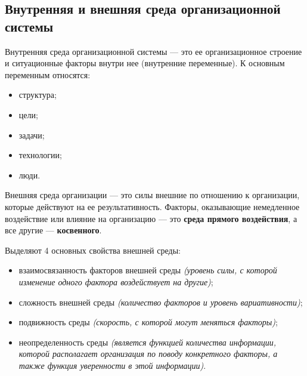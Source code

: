 \documentclass[a4paper,12pt,oneside,final]{extarticle}
\numberwithin{equation}{section}
\begin{document}
\subsection{Внутренняя и внешняя среда организационной системы}
Внутренняя среда организационной системы --- это ее организационное строение и ситуационные факторы внутри нее (внутренние переменные).
К основным переменным относятся: 
\begin{itemize}
	\item структура;
	\item цели;
	\item задачи;
	\item технологии; 
	\item люди.
\end{itemize}

Внешняя среда организации --- это силы внешние по отношению к организации, которые действуют на ее результативность. 
Факторы, оказывающие немедленное воздействие или влияние на организацию --- это \textbf{среда прямого воздействия}, а все другие --- \textbf{косвенного}.

Выделяют 4 основных свойства внешней среды: 
\begin{itemize}
	\item взаимосвязанность факторов внешней среды \textit{(уровень силы, с которой изменение одного фактора воздействует на другие)}; 
	\item сложность внешней среды \textit{(количество факторов и уровень вариативности)}; 
	\item подвижность среды \textit{(скорость, с которой могут меняться факторы)}; 
	\item неопределенность среды \textit{(является функцией количества информации, которой располагает организация по поводу конкретного факторы, а также функция уверенности в этой информации)}. 
\end{itemize}
\end{document}
